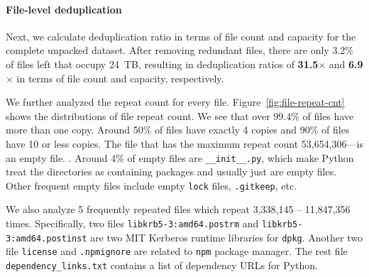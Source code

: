 \paragraph{File-level deduplication}
%
Next, we calculate deduplication ratio in terms of file count and capacity for
the complete unpacked dataset.
%
After removing redundant files, there are only 3.2\% of files left that occupy
24~TB, resulting in deduplication ratios of \textbf{31.5$\times$} and
\textbf{6.9$\times$} in terms of file count and capacity, respectively.
%

%
We further analyzed the repeat count for every file.
%
Figure~\ref{fig:file-repeat-cnt} shows the distributions of file repeat count.  
%
We see that over 99.4\% of files have more than one copy.
%
Around 50\% of files have exactly 4 copies and 90\% of files have 10 or less
copies. 
%
The file that has the maximum repeat count 53,654,306---is an empty file.
%
.
Around 4\% of empty files are \texttt{\_\_init\_\_.py}, which make Python treat the 
directories as containing packages and usually just are empty files. 
Other frequent empty files include empty \texttt{lock} files, \texttt{.gitkeep}, etc.

We also analyze 5 frequently repeated files which repeat 3,338,145 -- 11,847,356 times.
Specifically, two files 
\texttt{libkrb5-3:amd64.postrm} and \texttt{libkrb5-3:amd64.postinst}
are two MIT Kerberos runtime libraries for \texttt{dpkg}.
Another two file \texttt{license} and \texttt{.npmignore} are related to \texttt{npm} package manager.
The rest file \texttt{dependency\_links.txt} contains a list of dependency URLs for Python.
